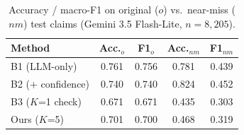 \begin{table}[t]
\centering
\caption{Accuracy / macro-F1 on original ($o$) vs.\ near-miss ($nm$) test claims (Gemini 3.5 Flash-Lite, $n=8{,}205$).}
\label{tab:main-results}
\footnotesize
\begin{tabular}{lcccc}
\toprule
Method & Acc.$_o$ & F1$_o$ & Acc.$_{nm}$ & F1$_{nm}$ \\
\midrule
B1 (LLM-only) & 0.761 & 0.756 & 0.781 & 0.439 \\
B2 (+ confidence) & 0.740 & 0.740 & 0.824 & 0.452 \\
B3 ($K$=1 check) & 0.671 & 0.671 & 0.435 & 0.303 \\
Ours ($K$=5) & 0.701 & 0.700 & 0.468 & 0.319 \\
\bottomrule
\end{tabular}
\end{table}
